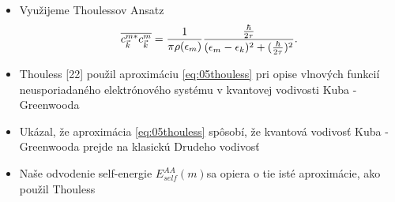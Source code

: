 \documentclass[
	11pt, %
]{beamer}
\begin{document}
\begin{frame}
\begin{itemize}
\item Využijeme Thoulessov Ansatz
\begin{align}
\label{eq:05thouless}
\overline{c^{m*}_{\vec{k}}c^{m}_{\vec{k}}}=\frac{1}{\pi \rho(\epsilon_m)}\frac{\frac{\hbar}{2\tau}}{(\epsilon_m-\epsilon_{k})^2+(\frac{\hbar}{2\tau})^2} \text{.}
\end{align}
\item Thouless [22] použil aproximáciu \eqref{eq:05thouless} pri opise vlnových funkcií neusporiadaného elektrónového systému v kvantovej vodivosti Kuba - Greenwooda
\item Ukázal, že aproximácia \eqref{eq:05thouless} spôsobí, že kvantová vodivosť Kuba - Greenwooda prejde na klasickú Drudeho vodivosť
\item Naše odvodenie self-energie  $E_{self}^{AA}(m)$sa opiera o tie isté aproximácie, ako použil Thouless
\end{itemize}
\end{frame}
\end{document}
